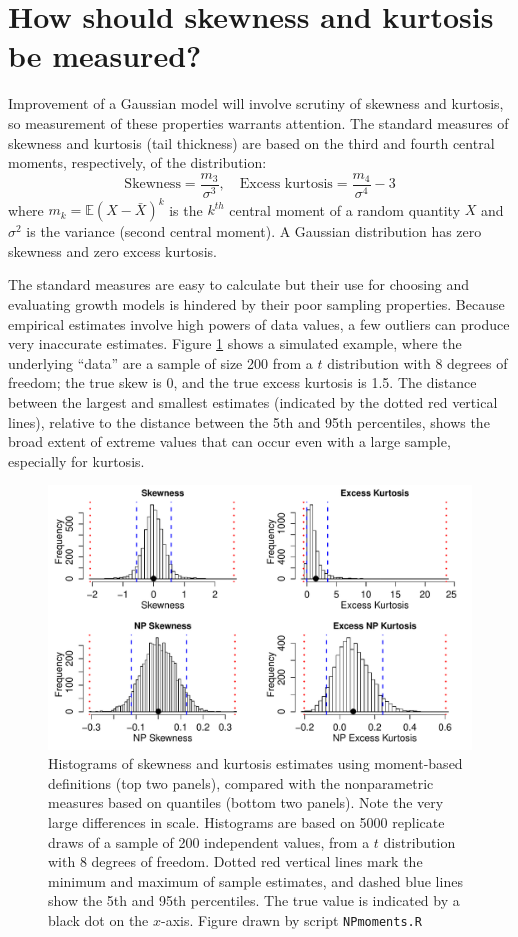 \documentclass[12pt]{article}
\newcounter{box}
\newcommand{\be}{\begin{equation}}
\newcommand{\ee}{\end{equation}}
\begin{document}
\section{How should skewness and kurtosis be measured?}
\label{sec:NPmeasures} 
Improvement of a Gaussian model will involve scrutiny of skewness and kurtosis, so measurement of these properties warrants attention. 
The standard measures of skewness and kurtosis (tail thickness) are based on the third and fourth central moments, respectively, of the distribution: 
\be
\mbox{Skewness} = \frac{m_3}{\sigma^3}, \quad \mbox{Excess kurtosis} = \frac{m_4}{\sigma^4}-3
\ee
where $m_k = \mathbb{E}(X - \bar{X})^k$ is the $k^{th}$ central moment of a random quantity $X$ 
and $\sigma^2$ is the variance (second central moment). 
A Gaussian distribution has zero skewness and zero excess kurtosis. 

The standard measures are easy to calculate but their use for choosing and evaluating growth models is hindered by their poor sampling properties. 
Because empirical estimates involve high powers of data values, a few outliers can produce very inaccurate estimates. 
Figure \ref{fig:NPmoments} shows a simulated example, where the underlying ``data'' are a sample of size 200 from a $t$ distribution with 
8 degrees of freedom; the true skew is 0, and the true excess kurtosis is 1.5. 
The distance between the largest and smallest estimates (indicated by the dotted red vertical lines), relative to the distance 
between the 5th and 95th percentiles, shows the broad extent of extreme values that can occur even with a large sample, especially for kurtosis. 

\begin{figure}[tbp]
\includegraphics[width=\textwidth]{figures/NPmoments.pdf}
\caption{Histograms of skewness and kurtosis estimates using moment-based definitions (top two panels), compared with the nonparametric measures based on quantiles (bottom two panels). 
Note the very large differences in scale. Histograms are based on 5000 replicate draws 
of a sample of 200 independent values, from a $t$ distribution with 8 degrees of freedom. 
Dotted red vertical lines mark the minimum and maximum of sample estimates, and dashed blue lines show the 5th and 95th percentiles. 
The true value is indicated by a black dot on the $x$-axis.
Figure drawn by script \texttt{NPmoments.R}}
\label{fig:NPmoments}
\end{figure} 
\end{document}
